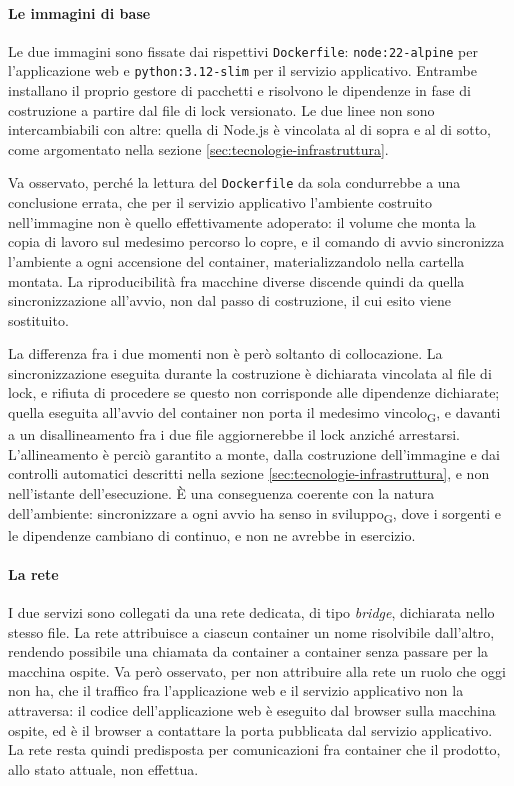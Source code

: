 \documentclass[a4paper, 10pt]{article}
\newcommand{\vPython}{3.12}     %
\newcommand{\vNode}{22}         %
\begin{document}
\paragraph{Le immagini di base}
Le due immagini sono fissate dai rispettivi \texttt{Dockerfile}: \texttt{node:\vNode{}-alpine} per l'applicazione web e \texttt{python:\vPython{}-slim} per il servizio applicativo. Entrambe installano il proprio gestore di pacchetti e risolvono le dipendenze in fase di costruzione a partire dal file di lock versionato. Le due linee non sono intercambiabili con altre: quella di Node.js è vincolata al di sopra e al di sotto, come argomentato nella sezione \ref{sec:tecnologie-infrastruttura}.

Va osservato, perché la lettura del \texttt{Dockerfile} da sola condurrebbe a una conclusione errata, che per il servizio applicativo l'ambiente costruito nell'immagine non è quello effettivamente adoperato: il volume che monta la copia di lavoro sul medesimo percorso lo copre, e il comando di avvio sincronizza l'ambiente a ogni accensione del container, materializzandolo nella cartella montata. La riproducibilità fra macchine diverse discende quindi da quella sincronizzazione all'avvio, non dal passo di costruzione, il cui esito viene sostituito.

La differenza fra i due momenti non è però soltanto di collocazione. La sincronizzazione eseguita durante la costruzione è dichiarata vincolata al file di lock, e rifiuta di procedere se questo non corrisponde alle dipendenze dichiarate; quella eseguita all'avvio del container non porta il medesimo vincolo\textsubscript{G}, e davanti a un disallineamento fra i due file aggiornerebbe il lock anziché arrestarsi. L'allineamento è perciò garantito a monte, dalla costruzione dell'immagine e dai controlli automatici descritti nella sezione \ref{sec:tecnologie-infrastruttura}, e non nell'istante dell'esecuzione. È una conseguenza coerente con la natura dell'ambiente: sincronizzare a ogni avvio ha senso in sviluppo\textsubscript{G}, dove i sorgenti e le dipendenze cambiano di continuo, e non ne avrebbe in esercizio.

\paragraph{La rete}
I due servizi sono collegati da una rete dedicata, di tipo \textit{bridge}, dichiarata nello stesso file. La rete attribuisce a ciascun container un nome risolvibile dall'altro, rendendo possibile una chiamata da container a container senza passare per la macchina ospite. Va però osservato, per non attribuire alla rete un ruolo che oggi non ha, che il traffico fra l'applicazione web e il servizio applicativo non la attraversa: il codice dell'applicazione web è eseguito dal browser sulla macchina ospite, ed è il browser a contattare la porta pubblicata dal servizio applicativo. La rete resta quindi predisposta per comunicazioni fra container che il prodotto, allo stato attuale, non effettua.
\end{document}
